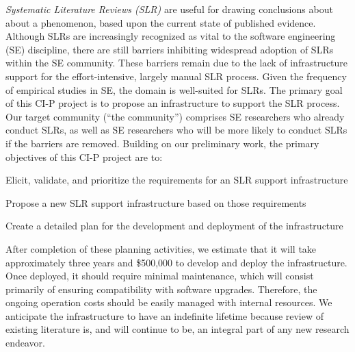 
\emph{Systematic Literature Reviews (SLR)} are useful for drawing conclusions about about a phenomenon, based upon the current state of published evidence.
Although SLRs are increasingly recognized as vital to the software engineering (SE) discipline,
there are still barriers inhibiting widespread adoption of SLRs within the SE community.
These barriers remain due to the lack of infrastructure support for the effort-intensive, largely manual SLR process.
Given the frequency of empirical studies in SE, the domain is well-suited for SLRs.
The primary goal of this CI-P project is to propose an infrastructure to support the SLR process.
Our target community (``the community'') comprises SE researchers who already conduct SLRs, as well as SE researchers who will be more likely to conduct SLRs if the barriers are removed. Building on our preliminary work, the primary objectives of this CI-P project are to: 
\begin{itemize*}
	\item{Elicit, validate, and prioritize the requirements for an SLR support infrastructure}
   \item{Propose a new SLR support infrastructure based on those requirements}
	\item{Create a detailed plan for the development and deployment of the infrastructure}
\end{itemize*}

\vspace*{-4pt }

After completion of these planning activities, we estimate that it will take approximately three years and \$500,000 to develop and deploy the infrastructure. Once deployed, it should require minimal maintenance, which will consist primarily of ensuring compatibility with software upgrades. Therefore, the ongoing operation costs should be easily managed with internal resources. We anticipate the infrastructure to have an indefinite lifetime because review of existing literature is, and will continue to be, an integral part of any new research endeavor. 

